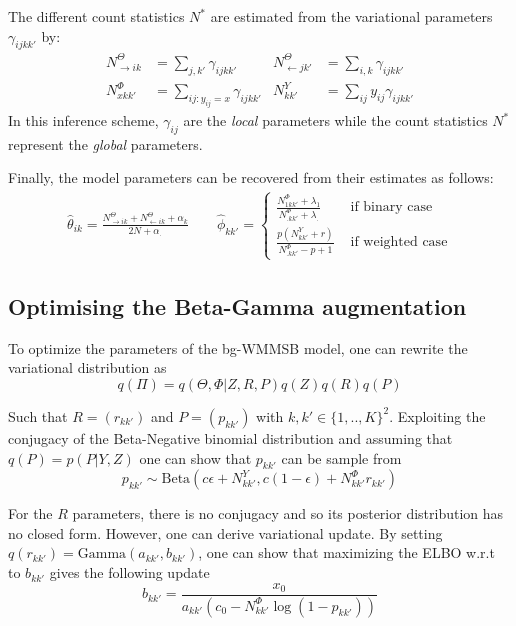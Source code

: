 The different count statistics $N^*$ are estimated from the variational parameters $\gamma_{ijkk'}$ by:
%
\begin{align} \label{eq:sss}
    N^{\Theta}_{\rightarrow ik} &= \sum_{j, k'} \gamma_{ijkk'}        & N^{\Theta}_{\leftarrow jk'} &= \sum_{i, k} \gamma_{ijkk'}  \nonumber \\
    N^{\Phi}_{xkk'} &= \sum_{ij:y_{ij}=x} \gamma_{ijkk'}  & N^{Y}_{kk'} &= \sum_{ij} y_{ij}\gamma_{ijkk'}
\end{align}
%
In this inference scheme, $\gamma_{ij}$ are the \emph{local} parameters while the count statistics $N^*$ represent the \emph{global} parameters.  

Finally, the model parameters can be recovered from their estimates as follows:
%
\begin{align*}
\hat \theta_{ik} = \frac{N^{\Theta}_{\rightarrow ik} + N^{\Theta}_{\leftarrow ik} + \alpha_k}{2N + \alpha_{\bm{.}}} \qquad 
\hat \phi_{kk'}=\begin{cases}
     \frac{N^{\Phi}_{1 kk'} + \lambda_1}{N^{\Phi}_{\bm{.}kk'} + \lambda_{\bm{.}}} & \textrm{ if binary case} \\
    \frac{p(N^Y_{kk'} + r)}{N^{\Phi}_{\bm{.}kk'} - p + 1}  & \textrm{ if weighted case} 
    \end{cases}
\end{align*}

\subsection{Optimising the Beta-Gamma augmentation}

To optimize the parameters of the bg-WMMSB model, one can rewrite the variational distribution as
\begin{equation*}
q(\Pi) = q(\Theta, \Phi|Z, R, P) q(Z)q(R)q(P)
\end{equation*}

Such that $R=(r_{kk'})$ and $P=(p_{kk'})$ with $k,k' \in \{1,..,K\}^2$. Exploiting the conjugacy of the Beta-Negative binomial distribution and assuming that $q(P)=p(P|Y,Z)$  one can show that $p_{kk'}$ can be sample from
\begin{equation} \label{eq:pk_update}
p_{kk'} \sim \textrm{Beta}(c\epsilon + N^Y_{kk'}, c(1-\epsilon) + N^\Phi_{kk'}r_{kk'})
\end{equation}

For the $R$ parameters, there is no conjugacy and so its posterior distribution has no closed form. However, one can derive variational update. By setting $q(r_{kk'}) = \textrm{Gamma}(a_{kk'},b_{kk'})$, one can show that maximizing the ELBO w.r.t to $b_{kk'}$ gives the following update
\begin{equation} \label{eq:bk_update}
b_{kk'}= \frac{x_0}{a_{kk'} (c_0  -N^\Phi_{kk'}\log(1-p_{kk'}))}
\end{equation}

